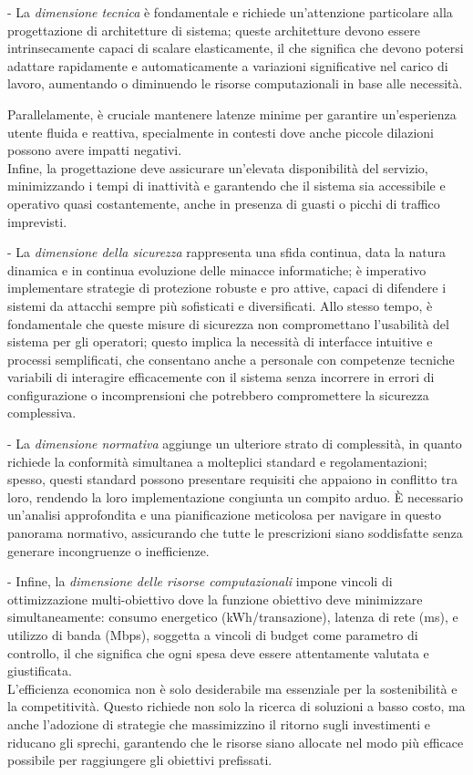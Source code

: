 - La \emph{dimensione tecnica} è fondamentale e richiede un'attenzione
particolare alla progettazione di architetture di sistema; queste
architetture devono essere intrinsecamente capaci di scalare
elasticamente, il che significa che devono potersi adattare rapidamente
e automaticamente a variazioni significative nel carico di lavoro,
aumentando o diminuendo le risorse computazionali in base alle
necessità. 

Parallelamente, è cruciale mantenere latenze minime per garantire
un'esperienza utente fluida e reattiva, specialmente in contesti dove
anche piccole dilazioni possono avere impatti negativi.\\
Infine, la progettazione deve assicurare un'elevata disponibilità del
servizio, minimizzando i tempi di inattività e garantendo che il sistema
sia accessibile e operativo quasi costantemente, anche in presenza di
guasti o picchi di traffico imprevisti.

- La \emph{dimensione della sicurezza} rappresenta una sfida continua,
data la natura dinamica e in continua evoluzione delle minacce
informatiche; è imperativo implementare strategie di protezione robuste
e pro attive, capaci di difendere i sistemi da attacchi sempre più
sofisticati e diversificati.
Allo stesso tempo, è fondamentale che queste misure di sicurezza non
compromettano l'usabilità del sistema per gli operatori; questo implica
la necessità di interfacce intuitive e processi semplificati, che
consentano anche a personale con competenze tecniche variabili di
interagire efficacemente con il sistema senza incorrere in errori di
configurazione o incomprensioni che potrebbero compromettere la
sicurezza complessiva.

- La \emph{dimensione normativa} aggiunge un ulteriore strato di
complessità, in quanto richiede la conformità simultanea a molteplici
standard e regolamentazioni; spesso, questi standard possono presentare
requisiti che appaiono in conflitto tra loro, rendendo la loro
implementazione congiunta un compito arduo.
È necessario un'analisi approfondita e una pianificazione meticolosa per
navigare in questo panorama normativo, assicurando che tutte le
prescrizioni siano soddisfatte senza generare incongruenze o
inefficienze.

- Infine, la \emph{dimensione delle risorse computazionali} impone vincoli di ottimizzazione multi-obiettivo dove la funzione obiettivo deve minimizzare simultaneamente: consumo energetico (kWh/transazione), latenza di rete (ms), e utilizzo di banda (Mbps), soggetta a vincoli di budget come parametro di controllo, il che significa che ogni spesa deve essere attentamente valutata e giustificata.\\
L'efficienza economica non è solo desiderabile ma essenziale per la
sostenibilità e la competitività. Questo richiede non solo la ricerca di
soluzioni a basso costo, ma anche l'adozione di strategie che
massimizzino il ritorno sugli investimenti e riducano gli sprechi,
garantendo che le risorse siano allocate nel modo più efficace possibile
per raggiungere gli obiettivi prefissati.


